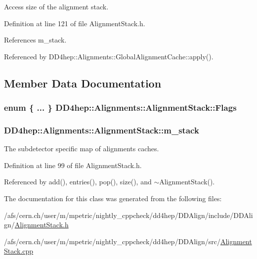 Access size of the alignment stack. 

Definition at line 121 of file AlignmentStack.h.

References m\_\-stack.

Referenced by DD4hep::Alignments::GlobalAlignmentCache::apply().

\subsection{Member Data Documentation}
\hypertarget{class_d_d4hep_1_1_alignments_1_1_alignment_stack_acf79d8d4af7ef5666d1096280c8da3e8}{
\subsubsection[{Flags}]{\setlength{\rightskip}{0pt plus 5cm}enum \{ ... \}   {\bf DD4hep::Alignments::AlignmentStack::Flags}}}
\label{class_d_d4hep_1_1_alignments_1_1_alignment_stack_acf79d8d4af7ef5666d1096280c8da3e8}
\hypertarget{class_d_d4hep_1_1_alignments_1_1_alignment_stack_ae6d6fe967fc507fc1275e15f5cbff876}{
\subsubsection[{m\_\-stack}]{ {\bf DD4hep::Alignments::AlignmentStack::m\_\-stack}}}
\label{class_d_d4hep_1_1_alignments_1_1_alignment_stack_ae6d6fe967fc507fc1275e15f5cbff876}


The subdetector specific map of alignments caches. 

Definition at line 99 of file AlignmentStack.h.

Referenced by add(), entries(), pop(), size(), and $\sim$AlignmentStack().

The documentation for this class was generated from the following files:\begin{DoxyCompactItemize}
\item 
/afs/cern.ch/user/m/mpetric/nightly\_\-cppcheck/dd4hep/DDAlign/include/DDAlign/\hyperlink{_alignment_stack_8h}{AlignmentStack.h}\item 
/afs/cern.ch/user/m/mpetric/nightly\_\-cppcheck/dd4hep/DDAlign/src/\hyperlink{_alignment_stack_8cpp}{AlignmentStack.cpp}\end{DoxyCompactItemize}
